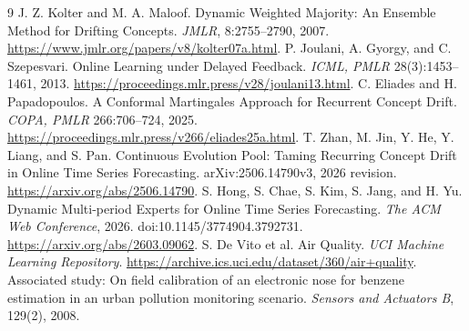 \documentclass[10pt]{article}
\begin{document}
\begin{thebibliography}{9}
 J. Z. Kolter and M. A. Maloof. Dynamic Weighted Majority: An Ensemble Method for Drifting Concepts. \emph{JMLR}, 8:2755--2790, 2007. \url{https://www.jmlr.org/papers/v8/kolter07a.html}.
 P. Joulani, A. Gyorgy, and C. Szepesvari. Online Learning under Delayed Feedback. \emph{ICML, PMLR} 28(3):1453--1461, 2013. \url{https://proceedings.mlr.press/v28/joulani13.html}.
 C. Eliades and H. Papadopoulos. A Conformal Martingales Approach for Recurrent Concept Drift. \emph{COPA, PMLR} 266:706--724, 2025. \url{https://proceedings.mlr.press/v266/eliades25a.html}.
 T. Zhan, M. Jin, Y. He, Y. Liang, and S. Pan. Continuous Evolution Pool: Taming Recurring Concept Drift in Online Time Series Forecasting. arXiv:2506.14790v3, 2026 revision. \url{https://arxiv.org/abs/2506.14790}.
 S. Hong, S. Chae, S. Kim, S. Jang, and H. Yu. Dynamic Multi-period Experts for Online Time Series Forecasting. \emph{The ACM Web Conference}, 2026. doi:10.1145/3774904.3792731. \url{https://arxiv.org/abs/2603.09062}.
 S. De Vito et al. Air Quality. \emph{UCI Machine Learning Repository}. \url{https://archive.ics.uci.edu/dataset/360/air+quality}. Associated study: On field calibration of an electronic nose for benzene estimation in an urban pollution monitoring scenario. \emph{Sensors and Actuators B}, 129(2), 2008.
\end{thebibliography}
\end{document}
